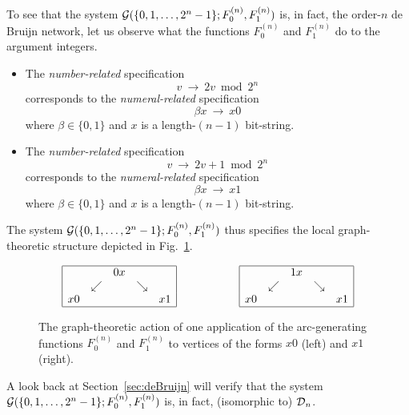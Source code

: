 To see that the system $\mbox{$\cal G$}(\{0, 1, \ldots, 2^n-1\}; F^{(n)}_0, F^{(n)}_1)$ is, in fact, the order-$n$
de Bruijn network, let us observe what the functions $F^{(n)}_0$ and $F^{(n)}_1$ do to the
argument integers.
\begin{itemize}
\item
The {\em number-related} specification
\[ v \ \longrightarrow \ 2v \bmod 2^n \]
corresponds to the {\em numeral-related} specification
\[ \beta x \ \longrightarrow \ x0 \]
where $\beta \in \{0,1\}$ and $x$ is a length-$(n-1)$ bit-string.

\item
The {\em number-related} specification
\[ v \ \longrightarrow \ 2v+1  \bmod 2^n \]
corresponds to the {\em numeral-related} specification
\[ \beta x \ \longrightarrow \ x1 \]
where $\beta \in \{0,1\}$ and $x$ is a length-$(n-1)$ bit-string.
\end{itemize}
The system $\mbox{$\cal G$}(\{0, 1, \ldots, 2^n-1\}; F^{(n)}_0, F^{(n)}_1)$ thus specifies the local
graph-theoretic structure depicted in Fig.~\ref{fig:one-DB-node}.
\begin{figure}[hbt]
\[  \begin{array}{ccc}
\begin{array}{|ccccc|}
\hline
     &                & 0x &               &      \\
     & \swarrow &      & \searrow &      \\
x0 &                 &     &                & x1 \\
\hline
\end{array}
  & \hspace*{.5in} &
\begin{array}{|ccccc|}
\hline
     &                & 1x  &               &       \\ 
     & \swarrow &      & \searrow &       \\
x0 &                 &     &                & x1 \\
\hline
\end{array}
\end{array}
\]
\caption{The graph-theoretic action of one application of the arc-generating functions 
$F^{(n)}_0$ and  $F^{(n)}_1$ to vertices of the forms $x0$ (left) and $x1$ (right).}
\label{fig:one-DB-node}
\end{figure}
A look back at Section~\ref{sec:deBruijn} will verify that the system
$\mbox{$\cal G$}(\{0, 1, \ldots, 2^n-1\}; F^{(n)}_0, F^{(n)}_1)$ is, in fact, (isomorphic to) $\mbox{$\cal D$}_n$.

